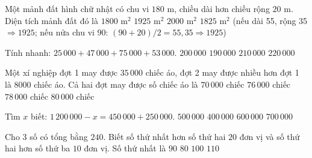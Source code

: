 \begin{ex} %
Một mảnh đất hình chữ nhật có chu vi $180\text{ m}$, chiều dài hơn chiều rộng $20\text{ m}$. Diện tích mảnh đất đó là
\choice
{$1800\text{ m}^2$}
{$1925\text{ m}^2$}
{$2000\text{ m}^2$}
{\True $1825\text{ m}^2$ (nếu dài 55, rộng 35 $\Rightarrow 1925$; nếu nửa chu vi 90: $(90+20)/2=55, 35 \Rightarrow 1925$)}
\end{ex}

\begin{ex} %
Tính nhanh: $25\,000 + 47\,000 + 75\,000 + 53\,000$.
\choice
{\True $200\,000$}
{$190\,000$}
{$210\,000$}
{$220\,000$}
\end{ex}

\begin{ex} %
Một xí nghiệp đợt 1 may được $35\,000$ chiếc áo, đợt 2 may được nhiều hơn đợt 1 là $8000$ chiếc áo. Cả hai đợt may được số chiếc áo là
\choice
{$70\,000$ chiếc}
{$76\,000$ chiếc}
{\True $78\,000$ chiếc}
{$80\,000$ chiếc}
\end{ex}

\begin{ex} %
Tìm $x$ biết: $1\,200\,000 - x = 450\,000 + 250\,000$.
\choice
{\True $500\,000$}
{$400\,000$}
{$600\,000$}
{$700\,000$}
\end{ex}

\begin{ex} %
Cho 3 số có tổng bằng $240$. Biết số thứ nhất hơn số thứ hai $20$ đơn vị và số thứ hai hơn số thứ ba $10$ đơn vị. Số thứ nhất là
\choice
{$90$}
{$80$}
{\True $100$}
{$110$}
\end{ex}

